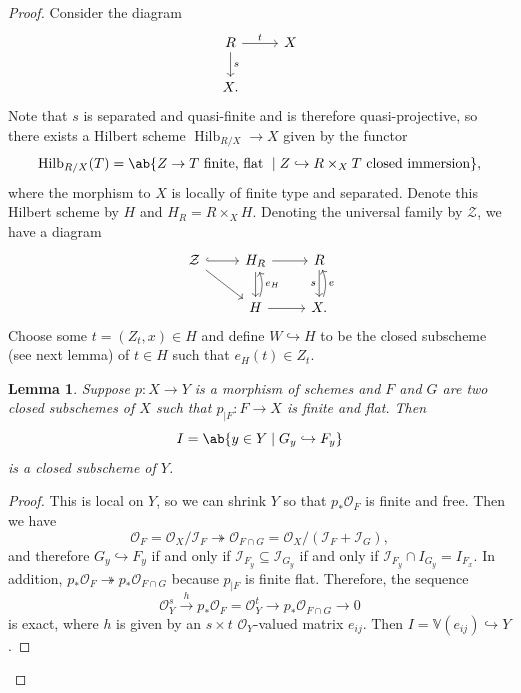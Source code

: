 \documentclass{amsart}
\newtheorem{lem}[thm]{Lemma}
\theoremstyle{definition}
\theoremstyle{remark}
\theoremstyle{plain}
\theoremstyle{definition}
\theoremstyle{remark}
\newcommand{\mc}[1]{\mathcal{#1}}
\newcommand{\on}[1]{\operatorname{#1}}
\newcommand{\1}{\mathbf{1}}
\newcommand{\2}{\mathbf{2}}
\newcommand{\3}{\mathbf{3}}
\begin{document}
\begin{proof}
    Consider the diagram 
    \begin{equation*}
    \begin{tikzcd}
        R \ar{r}{t} \ar{d}{s} & X \\
        X.
    \end{tikzcd}
    \end{equation*}
    Note that \(s\) is separated and quasi-finite and is therefore quasi-projective, so there exists a Hilbert scheme \(\on{Hilb}_{R/X} \to X\) given by the functor
    \[ \on{Hilb}_{R/X}(T) = \ab\{ Z \to T \text{ finite, flat } \mid Z \hookrightarrow R \times_X T \text{ closed immersion} \}, \]
    where the morphism to \(X\) is locally of finite type and separated. Denote this Hilbert scheme by \(H\) and \(H_R = R \times_X H\). Denoting the universal family by \(\mc{Z}\), we have a diagram
    \begin{equation*}
    \begin{tikzcd}
        \mc{Z} \ar[hookrightarrow]{r} \ar{dr}&  H_R \ar{d} \ar{r} & R \ar{d}[swap]{s} \\
        & H \ar{r} \ar[bend right=20]{u}[swap]{e_H} & X \ar[bend right=20]{u}[swap]{e}.
    \end{tikzcd}
    \end{equation*}
    Choose some \(t = (Z_t,x) \in H\) and define \(W \hookrightarrow H\) to be the closed subscheme (see next lemma) of \(t \in H\) such that \(e_H(t) \in Z_t\). 
    \begin{lem}
        Suppose \(p \colon X \to Y\) is a morphism of schemes and \(F\) and \(G\) are two closed subschemes of \(X\) such that \(p_{|F} \colon F \to X\) is finite and flat. Then 
        \[ I = \ab\{ y \in Y \mid G_y \hookrightarrow F_y \} \]
        is a closed subscheme of \(Y\).
    \end{lem}
    \begin{proof}
        This is local on \(Y\), so we can shrink \(Y\) so that \(p_* \mc{O}_F\) is finite and free. Then we have
        \[ \mc{O}_F = \mc{O}_X / \mc{I}_F \twoheadrightarrow \mc{O}_{F \cap G} = \mc{O}_X / (\mc{I}_F + \mc{I}_G), \]
        and therefore \(G_y \hookrightarrow F_y\) if and only if \(\mc{I}_{F_y} \subseteq \mc{I}_{G_y}\) if and only if \(\mc{I}_{F_y} \cap I_{G_y} = I_{F_x}\). In addition, \(p_* \mc{O}_F \twoheadrightarrow p_* \mc{O}_{F \cap G}\) because \(p_{|F}\) is finite flat. Therefore, the sequence
        \[ \mc{O}_Y^s \xrightarrow{h} p_* \mc{O}_F = \mc{O}_Y^t \to p_* \mc{O}_{F \cap G} \to 0 \]
        is exact, where \(h\) is given by an \(s \times t\) \(\mc{O}_Y\)-valued matrix \(e_{ij}\). Then \(I = \mathbb{V}(e_{ij}) \hookrightarrow Y\).

\end{proof}
\end{proof}
\end{document}
